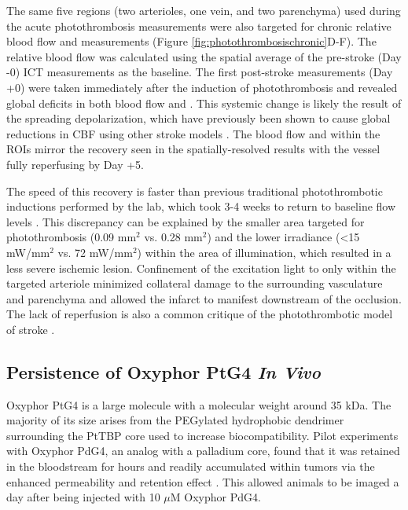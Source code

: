 The same five regions (two arterioles, one vein, and two parenchyma) used during the acute photothrombosis measurements were also targeted for chronic relative blood flow and  measurements (Figure \ref{fig:photothrombosischronic}D-F). The relative blood flow was calculated using the spatial average of the pre-stroke (Day -0) ICT measurements as the baseline. The first post-stroke measurements (Day +0) were taken immediately after the induction of photothrombosis and revealed global deficits in both blood flow and . This systemic change is likely the result of the spreading depolarization, which have previously been shown to cause global reductions in CBF using other stroke models \cite{Shin:2006dc, Nakamura:2010wp}. The blood flow and  within the ROIs mirror the recovery seen in the spatially-resolved results with the vessel fully reperfusing by Day +5.

The speed of this recovery is faster than previous traditional photothrombotic inductions performed by the lab, which took 3-4 weeks to return to baseline flow levels \cite{Schrandt:2015gu}. This discrepancy can be explained by the smaller area targeted for photothrombosis (0.09 mm$^2$ vs. 0.28 mm$^2$) and the lower irradiance (\textless15 mW/mm$^2$ vs. 72 mW/mm$^2$) within the area of illumination, which resulted in a less severe ischemic lesion. Confinement of the excitation light to only within the targeted arteriole minimized collateral damage to the surrounding vasculature and parenchyma and allowed the infarct to manifest downstream of the occlusion. The lack of reperfusion is also a common critique of the photothrombotic model of stroke \cite{Carmichael:2005gk}.

\subsection{Persistence of Oxyphor PtG4 \textit{In Vivo}}

Oxyphor PtG4 is a large molecule with a molecular weight around 35 kDa. The majority of its size arises from the PEGylated hydrophobic dendrimer surrounding the PtTBP core used to increase biocompatibility. Pilot experiments with Oxyphor PdG4, an analog with a palladium core, found that it was retained in the bloodstream for hours and readily accumulated within tumors via the enhanced permeability and retention effect \cite{Esipova:2011hi}. This allowed animals to be imaged a day after being injected with 10 $\mu$M Oxyphor PdG4.

